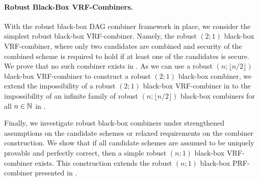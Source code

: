 \paragraph{Robust Black-Box VRF-Combiners.}
With the robust black-box DAG combiner framework in place, we consider the simplest robust black-box VRF-combiner.
Namely, the robust $(2;1)$ black-box VRF-combiner, where only two candidates are combined and security of the combined
scheme is required to hold if at least one of the candidates is secure. We prove that no such combiner exists in 
.
As we can use a robust $(n;\lfloor n/2\rfloor)$ black-box VRF-combiner to construct a robust $(2;1)$ black-box combiner, 
we extend the impossibility of a robust $(2;1)$ black-box VRF-combiner in  to the impossibility of an infinite family of robust $(n;\lfloor n/2\rfloor)$ black-box combiners
for all $n \in \mathbb{N}$ in . 

Finally, we investigate robust black-box combiners under strengthened assumptions on the candidate schemes or relaxed requirements on the combiner 
construction. We show that if all candidate schemes are assumed to be uniquely provable and perfectly correct, then 
a simple robust $(n;1)$ black-box VRF-combiner exists.
This construction extends the robust $(n;1)$ black-box PRF-combiner presented in .
